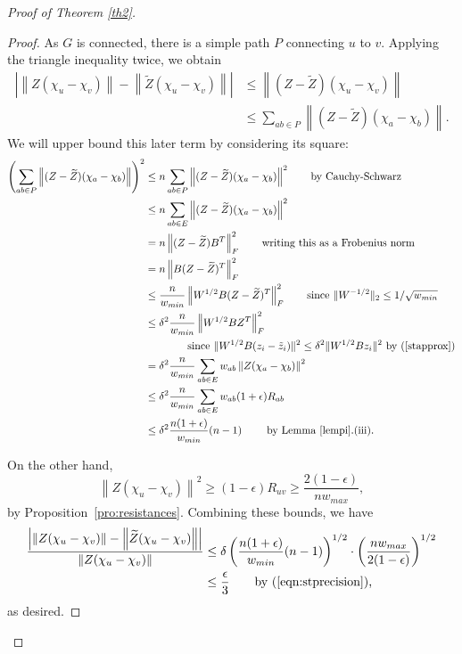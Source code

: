 \documentclass[11pt]{article}
\newcommand{\Ztilde}{\widetilde{Z}}
\def\norm#1{\left\| #1 \right\|}
\def\abs#1{\left|#1  \right|}
\begin{document}
\begin{proof}[Proof of Theorem \ref{th2}]
\begin{proof}
As $G$ is connected, there is a simple path $P$ connecting $u$ to $v$.
Applying the triangle inequality twice, we obtain
\begin{align*}
 \abs{ \norm{Z (\chi_{u} - \chi_{v})} -  \norm{\Ztilde  (\chi_{u} - \chi_{v})}}
& \leq 
   \norm{(Z - \Ztilde ) (\chi_{u} - \chi_{v})} \\
& \leq 
  \sum_{ab \in P} \norm{(Z - \Ztilde ) (\chi_{a} - \chi_{b})}.
\end{align*}
We will upper bound this later term by considering its square:
\begin{align*}
\left( \sum_{ab \in P} \norm{(Z - \Ztilde ) (\chi_{a} - \chi_{b})} \right)^{2}
& \leq 
n \sum_{ab \in P} \norm{(Z - \Ztilde ) (\chi_{a} - \chi_{b})}^{2}
\qquad \text{by Cauchy-Schwarz}
\\
& \leq 
n \sum_{ab \in E} \norm{(Z - \Ztilde ) (\chi_{a} - \chi_{b})}^{2} 
\\
& =
n \norm{(Z - \Ztilde ) B^{T}}_{F}^{2}
\qquad \text{writing this as a Frobenius norm}
\\ & = n \norm{B(Z - \Ztilde )^{T}}_{F}^{2}
\\
& \leq 
\frac{n}{w_{min}} \norm{W^{1/2} B(Z - \Ztilde )^{T}}_{F}^{2}
\qquad \text{since $\|W^{-1/2}\|_2\le 1/\sqrt{w_{min}}$}
\\
& \leq 
\delta^{2} \frac{n}{w_{min}} \norm{W^{1/2} B Z^{T}}_{F}^{2}
\\&\qquad\qquad \text{since $\|W^{1/2}B(z_i-\tilde{z}_i)\|^2\le \delta^2 \|W^{1/2}Bz_i\|^2$ by
(\ref{stapprox})}
\\
& = 
\delta^{2} \frac{n}{w_{min}} 
  \sum_{ab \in E} w_{ab} \norm{Z (\chi_{a} - \chi_{b})}^{2}
\\
& \leq 
\delta^{2} \frac{n}{w_{min}} 
  \sum_{ab \in E} w_{ab} (1 + \epsilon) R_{ab}
\\
& \leq 
\delta^{2} \frac{n (1+\epsilon )}{w_{min}} 
  (n-1)
\qquad \text{ by Lemma~\ref{lempi}.(iii).}
\end{align*}

On the other hand,
\[
  \norm{Z (\chi_{u} - \chi_{v})}^{2}
\geq 
  (1 - \epsilon) R_{uv}
\geq 
  \frac{2 (1-\epsilon)}{n w_{max}},
\]
by Proposition~\ref{pro:resistances}.
Combining these bounds, we have
\begin{align*}
\frac{
\abs{ \norm{Z (\chi_{u} - \chi_{v})} -  \norm{\Ztilde  (\chi_{u} - \chi_{v})}}
}{
  \norm{Z (\chi_{u} - \chi_{v})}
}
&\le 
\delta \left({\frac{n (1+\epsilon )}{w_{min}} (n-1)}\right)^{1/2}\cdot\left(\frac{n
w_{max}}{2(1-\epsilon)}\right)^{1/2}
\\&\le \frac{\epsilon}{3}\qquad\textrm{by (\ref{eqn:stprecision}),}
\end{align*}
as desired.
\end{proof}



\end{proof}
\end{document}
